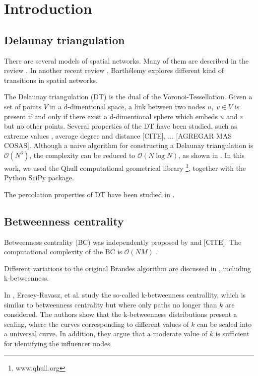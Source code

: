 \documentclass{article}
\begin{document}
\section{Introduction}

\subsection{Delaunay triangulation}

There are several models of spatial networks. Many of them are described in the review \cite{Barthelemy2011}. In another recent review \cite{Barthelemy2018}, Barth\'elemy explores different kind of transitions in spatial networks.

The Delaunay triangulation (DT) is the dual of the Voronoi-Tessellation. Given a set of points $V$ in a d-dimentional space, a link between two nodes $u,\;v\in V$ is present if and only if there exist a d-dimentional sphere which embeds $u$ and $v$ but no other points. Several properties of the DT have been studied, such as extreme values \cite{Lee1980}, average degree and distance [CITE], ... [AGREGAR MAS COSAS]. Although a naive algorithm for constructing a Delaunay triangulation is $\mathcal{O}(N^3)$, the complexity can be reduced to $\mathcal{O}(N\log N)$, as shown in \cite{Lee1980}. In this work, we used the Qhull computational geometrical library \footnote{www.qhull.org}, together with the Python SciPy package.

The percolation properties of DT have been studied in \cite{Becker2009,Alencar2020}.


\subsection{Betweenness centrality}

Betweenness centrality (BC) was independently proposed by \cite{Freeman1977ABetweenness} and [CITE]. The computational complexity of the BC is $\mathcal{O}(NM)$ \cite{Brandes2001ACentrality}.

Different variations to the original Brandes algorithm are discussed in \cite{Brandes2008}, including k-betweenness.

In \cite{Ercsey-Ravasz2010,Ercsey-Ravasz2012}, Ercsey-Ravasz, et al. study the so-called k-betweenness centrallity, which is similar to betweenness centrality but where only paths no longer than $k$ are considered. The authors show that the k-betweenness distributions present a scaling, where the curves corresponding to different values of $k$ can be scaled into a universal curve. In addition, they argue that a moderate value of $k$ is sufficient for identifying the influencer nodes. 
\end{document}
